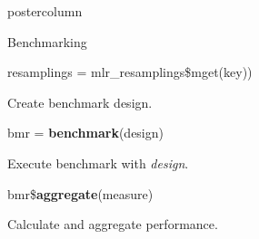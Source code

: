 \documentclass{beamer}
\begin{document}
\begin{frame}[fragile]{}
\begin{columns}
\begin{column}{.245\textwidth}
\begin{beamercolorbox}[center]{postercolumn}
\begin{minipage}{.98\textwidth}
{\begin{myblock}{Benchmarking}
\begin{codeboxmultiline}[width=21.95cm]
							      \hspace*{1ex}resamplings = mlr\_resamplings\$mget(key))
						      \end{codeboxmultiline}
						      Create benchmark design.
						      \\
						      \begin{codebox}
							      bmr = \textbf{benchmark}(design)
						      \end{codebox}
						      Execute benchmark with \textit{design}.
					      	\\
						      \begin{codebox}
							      bmr\$\textbf{aggregate}(measure)
						      \end{codebox}
						      Calculate and aggregate performance.
					        \end{myblock}\vfill
				            }
		          	\end{minipage}
		          \end{beamercolorbox}
	           \end{column}
            \end{columns}
          \end{frame}
        
\end{document}
